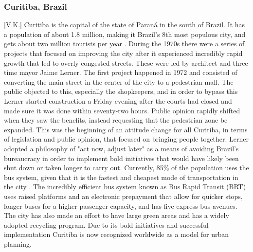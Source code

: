 \documentclass[12pt]{article}                       %
\begin{document}
\subsubsection{Curitiba, Brazil}[V.K.]
Curitiba is the capital of the state of Paraná in the south of Brazil. It has a population of about 1.8 million, making it Brazil's 8th most populous city, and gets about two million tourists per year \cite{Adler2016StoryCapital}. During the 1970s there were a series of projects that focused on improving the city after it experienced incredibly rapid growth that led to overly congested streets. These were led by architect and three time mayor Jaime Lerner. The first project happened in 1972 and consisted of converting the main street in the center of the city to a pedestrian mall. The public objected to this, especially the shopkeepers, and in order to bypass this Lerner started construction a Friday evening after the courts had closed and made sure it was done within seventy-two hours. Public opinion rapidly shifted when they saw the benefits, instead requesting that the pedestrian zone be expanded. This was the beginning of an attitude change for all Curitiba, in terms of legislation and public opinion, that focused on bringing people together. Lerner adopted a philosophy of "act now, adjust later" as a means of avoiding Brazil's bureaucracy in order to implement bold initiatives that would have likely been shut down or taken longer to carry out. Currently, 85\% of the population uses the bus system, given that it is the fastest and cheapest mode of transportation in the city \cite{Adler2016StoryCapital}. The incredibly efficient bus system known as Bus Rapid Transit (BRT) uses raised platforms and an electronic prepayment that allow for quicker stops, longer buses for a higher passenger capacity, and has five express bus avenues. The city has also made an effort to have large green areas and has a widely adopted recycling program. Due to its bold initiatives and successful implementation Curitiba is now recognized worldwide as a model for urban planning. 
\end{document}
